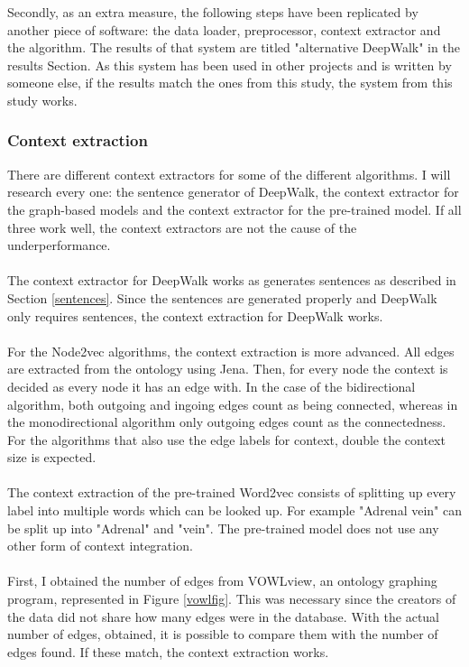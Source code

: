 \documentclass{article}
\begin{document}
  Secondly, as an extra measure, the following steps have been replicated by another piece of software: the data loader, preprocessor, context extractor and the algorithm. The results of that system are titled "alternative DeepWalk" in the results Section. As this system has been used in other projects and is written by someone else, if the results match the ones from this study, the system from this study works.
  
  \subsubsection{Context extraction} \label{contextextraction}
  There are different context extractors for some of the different algorithms. I will research every one: the sentence generator of DeepWalk, the context extractor for the graph-based models and the context extractor for the pre-trained model. If all three work well, the context extractors are not the cause of the underperformance.
  \paragraph{}
  The context extractor for DeepWalk works as generates sentences as described in Section \ref{sentences}. Since the sentences are generated properly and DeepWalk only requires sentences, the context extraction for DeepWalk works.
  \paragraph{}
  For the Node2vec algorithms, the context extraction is more advanced. All edges are extracted from the ontology using Jena. Then, for every node the context is decided as every node it has an edge with. In the case of the bidirectional algorithm, both outgoing and ingoing edges count as being connected, whereas in the monodirectional algorithm only outgoing edges count as the connectedness. For the algorithms that also use the edge labels for context, double the context size is expected.
  \paragraph{}
  The context extraction of the pre-trained Word2vec consists of splitting up every label into multiple words which can be looked up. For example "Adrenal vein" can be split up into "Adrenal" and "vein".
  The pre-trained model does not use any other form of context integration.
  \paragraph{}
  First, I obtained the number of edges from VOWLview\cite{vowlview}, an ontology graphing program, represented in Figure \ref{vowlfig}. This was necessary since the creators of the data did not share how many edges were in the database. With the actual number of edges, obtained, it is possible to compare them with the number of edges found. If these match, the context extraction works.
  
\end{document}
